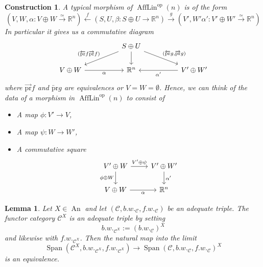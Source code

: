 \documentclass{article}
\newcommand{\xto}{\xrightarrow}
\newcommand{\xot}{\xleftarrow}
\newcommand{\R}{\mathbb{R}} %
\newcommand{\cC}{\mathcal{C}}
\newcommand{\op}{\mathrm{op}}
\newcommand{\pr}{\mathrm{pr}}
\DeclareMathOperator{\An}{An}
\DeclareMathOperator{\AffLin}{AffLin}
\DeclareMathOperator{\Span}{Span}
\newtheorem{lemma}{Lemma}
\newtheorem{construction}{Construction}
\begin{document}
\begin{construction}
    A typical morphism of $\AffLin^\op(n)$ is of the form 
          \[
            (V,W,\alpha\colon  V\oplus W \xto{\simeq} \R^n) \xot{f}
            (S,U,\beta \colon S \oplus U \to \R^n) \xto{g}
            (V',W'\alpha' \colon V'\oplus W' \xto{\simeq} \R^n)  
          \]
          In particular it gives us a commutative diagram 
          \[\begin{tikzcd}
              && {S \oplus U} \\
              {V\oplus W} && {\R^n} && {V'\oplus W'}
              \arrow["{(\overleftarrow{\pr}g,\overrightarrow{\pr}g)}", from=1-3, to=2-5]
              \arrow["{(\overleftarrow{\pr}f\overrightarrow{\pr}f)}"', from=1-3, to=2-1]
              \arrow["{\alpha }"', from=2-1, to=2-3]
              \arrow[from=1-3, to=2-3]
              \arrow["{\alpha'}", from=2-5, to=2-3]
          \end{tikzcd}\]
          where $\overrightarrow{\pr}f$ and $\overleftarrow{\pr}g$ are equivalences or $V=W=\emptyset$.
          Hence, we can think of the data of a morphism in $\AffLin^\op(n)$ to 
          consist of  
          \begin{itemize}
              \item A map $\phi \colon V' \to V$,
              \item A map $\psi \colon W \to W'$,
              \item A commutative square 
              \[\begin{tikzcd}
                  {V'\oplus W} & {V'\oplus W'} \\
                  {V\oplus W} & {\R^n}
                  \arrow["\alpha"', from=2-1, to=2-2]
                  \arrow["{\alpha'}", from=1-2, to=2-2]
                  \arrow["{\phi\oplus W}"', from=1-1, to=2-1]
                  \arrow["{V'\oplus \psi}", from=1-1, to=1-2]
              \end{tikzcd}\]
          \end{itemize} 
\end{construction}

\begin{lemma}
    Let $X \in \An$ and let $(\cC, b.w._{\cC}, f.w._{\cC})$ be an adequate triple. 
    The functor category $\cC^X$ is an adequate triple by setting
    \[
    b.w._{\cC^X} := (b.w._{\cC})^X    
    \]    
    and likewise with $f.w._{\cC^X}$.
    Then the natural map into the limit 
    \[
        \Span(\cC^X, b.w._{\cC^X}, f.w._{\cC^X}) \to \Span(\cC,b.w._{\cC}, f.w._{\cC})^X
    \]
    is an equivalence.
\end{lemma}
\end{document}
